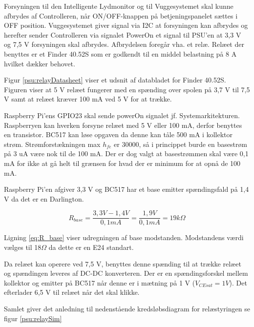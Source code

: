 Forsyningen til den Intelligente Lydmonitor og til Vuggesystemet skal kunne afbrydes af Controlleren, når ON/OFF-knappen på betjeningspanelet sættes i OFF position. Vuggesystemet giver signal via I2C at forsyningen kan afbrydes og herefter sender Controlleren via signalet PowerOn et signal til PSU'en at 3,3 V og 7,5 V forsyningen skal afbrydes. Afbrydelsen foregår vha. et relæ. Relæet der benyttes er et Finder 40.52S som er godkendt til en middel belastning på 8 A hvilket dækker behovet. 


Figur \ref{psu:relayDatasheet} viser et udsnit af databladet for Finder 40.52S. Figuren viser at 5 V relæet fungerer med en spænding over spolen på 3,7 V til 7,5 V samt at relæet kræver 100 mA ved 5 V for at trække.

Raspberry Pi'ens GPIO23 skal sende powerOn signalet jf. Systemarkitekturen. Raspberryen kan hverken forsyne relæet med 5 V eller 100 mA, derfor benyttes en transistor. BC517 kan løse opgaven da denne kan tåle 500 mA i kollektor strøm. Strømforstækningen max $h_{fe}$ er 30000, så i princippet burde en basestrøm på 3 uA være nok til de 100 mA. Der er dog valgt at basestrømmen skal være 0,1 mA for ikke at gå helt til grænsen for hvad der er minimum for at opnå de 100 mA. 

Raspberry Pi'en afgiver 3,3 V og BC517 har et base emitter spændingsfald på 1,4 V da det er en Darlington. 

\begin{equation}
{ R }_{ base }=\frac { 3,3V-1,4V }{ 0,1mA } =\frac { 1,9V }{ 0,1mA } =19k\Omega
\label{eq:R_base}
\end{equation}

Ligning \ref{eq:R_base} viser udregningen af base modstanden. Modstandens værdi vælges til 18$\Omega$ da dette er en E24 standart.  

Da relæet kan operere ved 7,5 V, benyttes denne spænding til at trække relæet og spændingen leveres af DC-DC konverteren. Der er en spændingsforskel mellem kollektor og emitter på BC517 når denne er i mætning på 1 V ($V_{CEsat} = 1 V$). Det efterlader 6,5 V til relæet når det skal klikke. 

Samlet giver det anledning til nedenstående kredsløbsdiagram for relæstyringen se figur \ref{psu:relaySim}


